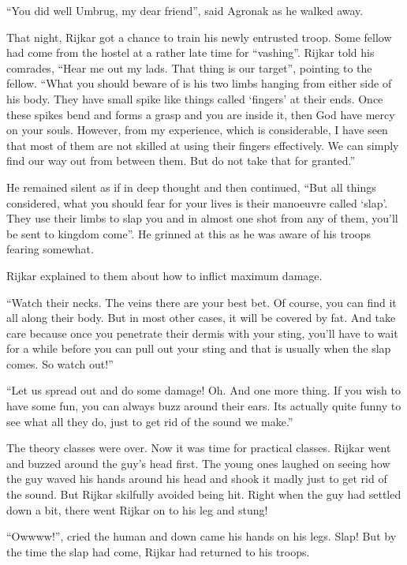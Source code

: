 \documentclass[twoside,11pt,titlepage]{article}
\begin{document}
``You did well Umbrug, my dear friend'', said Agronak as he walked away.

That night, Rijkar got a chance to train his newly entrusted troop. Some fellow had come from the hostel at a rather late time for ``vashing''. Rijkar told his comrades, ``Hear me out my lads. That thing is our target'', pointing to the fellow. ``What you should beware of is his two limbs hanging from either side of his body. They have small spike like things called `fingers' at their ends. Once these spikes bend and forms a grasp and you are inside it, then God have mercy on your souls. However, from my experience, which is considerable, I have seen that most of them are not skilled at using their fingers effectively. We can simply find our way out from between them. But do not take that for granted.''

He remained silent as if in deep thought and then continued, ``But all things considered, what you should fear for your lives is their manoeuvre called `slap'. They use their limbs to slap you and in almost one shot from any of them, you'll be sent to kingdom come''. He grinned at this as he was aware of his troops fearing somewhat.

Rijkar explained to them about how to inflict maximum damage.

``Watch their necks. The veins there are your best bet. Of course, you can find it all along their body. But in most other cases, it will be covered by fat. And take care because once you penetrate their dermis with your sting, you'll have to wait for a while before you can pull out your sting and that is usually when the slap comes. So watch out!''

``Let us spread out and do some damage! Oh. And one more thing. If you wish to have some fun, you can always buzz around their ears. Its actually quite funny to see what all they do, just to get rid of the sound we make.''

The theory classes were over. Now it was time for practical classes. Rijkar went and buzzed around the guy's head first. The young ones laughed on seeing how the guy waved his hands around his head and shook it madly just to get rid of the sound. But Rijkar skilfully avoided being hit. Right when the guy had settled down a bit, there went Rijkar on to his leg and stung!

``Owwww!'', cried the human and down came his hands on his legs. Slap! But by the time the slap had come, Rijkar had returned to his troops.
\end{document}
